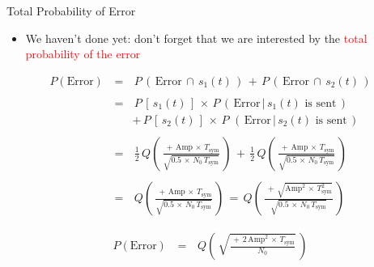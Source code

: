 \documentclass{Beamer}
\begin{document}
\begin{frame}[t,allowframebreaks]{Total Probability of Error}

\begin{itemize}

\item We haven't done yet: don't forget that we are interested by the \textcolor{red}{total probability of the error}
\end{itemize}

\begin{equation*}
\begin{array}{rcl}
P(\text{Error}) \, &=& \, P \,( \,\text{Error} \, \cap \, s_1(t) \,) \, + \, P \, (\, \text{Error} \, \cap \, s_2(t) \, ) \\ \\
		 &=& \, P \,[\, s_1(t) \,] \, \times \, P \, (\, \text{Error} \, | \, s_1(t) \text{ is sent} \,)   \\
		&& + \,  P \, [ \,s_2(t) \, ] \, \times \,P \, \,(\, \text{Error} \, | \, s_2(t)\text{ is sent} \,) \\ \\
		&=& \, \displaystyle\frac{1}{2} \, Q \left(\, \displaystyle\frac{ \, + \, \text{Amp} \, \times \, T_{\text{sym}}}{\sqrt{0.5 \, \times \, N_0 \, T_{\text{sym}}} } \, \right) \, + \, \displaystyle\frac{1}{2} \, Q \left(\, \displaystyle\frac{ \, + \, \text{Amp} \, \times \, T_{\text{sym}}}{\sqrt{0.5 \, \times \, N_0 \, T_{\text{sym}}} } \, \right) \\ \\
		&=& \,Q \left(\, \displaystyle\frac{ \, + \, \text{Amp} \, \times \, T_{\text{sym}}}{\sqrt{0.5 \, \times \, N_0 \, T_{\text{sym}}} } \, \right) \, = \, Q \left(\, \displaystyle\frac{ \, + \, \sqrt{\text{Amp}^2 \, \times \, T^2_{\text{sym}}} }{\sqrt{0.5 \, \times \, N_0 \, T_{\text{sym}}} } \, \right)
\end{array}
\label{Eq:Baseband_Binary:proba_error_2}
\end{equation*}



\newpage 

\begin{equation*}
\begin{array}{rcl}
P(\text{Error}) \, &=& \,Q \left(\, \displaystyle\sqrt{\frac{ \, + \, 2 \, \text{Amp}^2 \, \times \, T_{\text{sym}} }{N_0}}  \, \right)
\end{array}
\label{Eq:Baseband_Binary:proba_error_3}
\end{equation*}


\end{frame}
\end{document}
